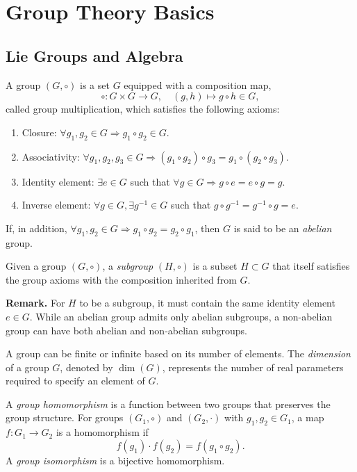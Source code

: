 \color{blue}


\section{Group Theory Basics}

\subsection{Lie Groups and Algebra}

\begin{definition}[Group]
A group $(G, \circ)$ is a set $G$ equipped with a composition map, 
\[
\circ : G \times G \to G, \quad (g, h) \mapsto g \circ h \in G,
\]
called group multiplication, which satisfies the following axioms:
\begin{enumerate}
    \item Closure: $\forall g_1, g_2 \in G \Rightarrow g_1 \circ g_2 \in G$.
    \item Associativity: $\forall g_1, g_2, g_3 \in G \Rightarrow (g_1 \circ g_2) \circ g_3 = g_1 \circ (g_2 \circ g_3)$.
    \item Identity element: $\exists e \in G$ such that $\forall g \in G \Rightarrow g \circ e = e \circ g = g$.
    \item Inverse element: $\forall g \in G, \exists g^{-1} \in G$ such that $g \circ g^{-1} = g^{-1} \circ g = e$.
\end{enumerate}
If, in addition, $\forall g_1, g_2 \in G \Rightarrow g_1 \circ g_2 = g_2 \circ g_1$, then $G$ is said to be an \emph{abelian} group.
\end{definition}

\begin{definition}[Subgroup]
Given a group $(G, \circ)$, a \emph{subgroup} $(H, \circ)$ is a subset $H \subset G$ that itself satisfies the group axioms with the composition inherited from $G$.
\end{definition}

\noindent
\textbf{Remark.} For $H$ to be a subgroup, it must contain the same identity element $e \in G$. While an abelian group admits only abelian subgroups, a non-abelian group can have both abelian and non-abelian subgroups.

A group can be finite or infinite based on its number of elements. The \emph{dimension} of a group $G$, denoted by $\dim(G)$, represents the number of real parameters required to specify an element of $G$.

\begin{definition}
A \emph{group homomorphism} is a function between two groups that preserves the group structure. For groups $(G_1, \circ)$ and $(G_2, \cdot)$ with $g_1, g_2 \in G_1$, a map $f : G_1 \to G_2$ is a homomorphism if
\[
f(g_1) \cdot f(g_2) = f(g_1 \circ g_2).
\]
A \emph{group isomorphism} is a bijective homomorphism.
\end{definition}

